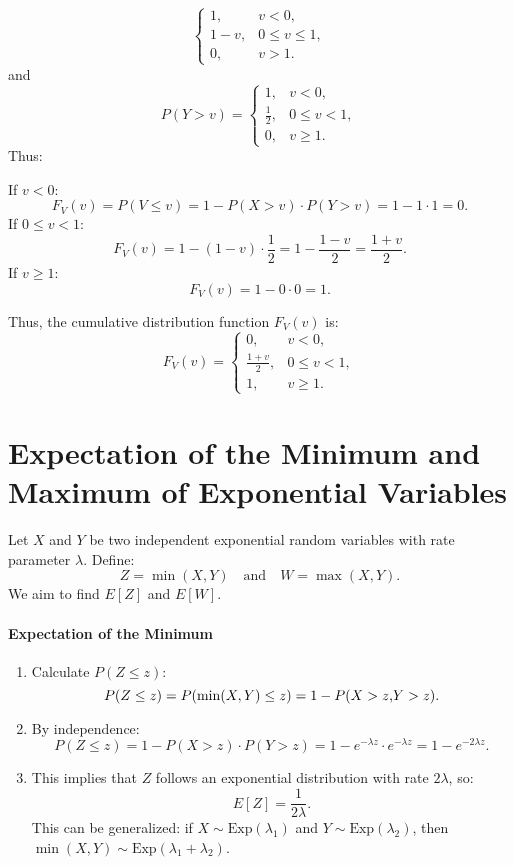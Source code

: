 \begin{enumerate}
\[\begin{cases}
1, & v < 0, \\
1 - v, & 0 \leq v \leq 1, \\
0, & v > 1.
\end{cases}
\]
and
\[
P(Y > v) = 
\begin{cases} 
1, & v < 0, \\
\frac{1}{2}, & 0 \leq v < 1, \\
0, & v \geq 1.
\end{cases}
\]
Thus:
\begin{enumerate}
{If \( v < 0 \):}
   \[
   F_V(v) = P(V \leq v) = 1 - P(X > v) \cdot P(Y > v) = 1 - 1 \cdot 1 = 0.
   \]
{If \( 0 \leq v < 1 \):}
   \[
   F_V(v) = 1 - (1 - v) \cdot \frac{1}{2} = 1 - \frac{1 - v}{2} = \frac{1 + v}{2}.
   \]
{If \( v \geq 1 \):}
   \[
   F_V(v) = 1 - 0 \cdot 0 = 1.
   \]
\end{enumerate}
Thus, the cumulative distribution function \( F_V(v) \) is:
\[
F_V(v) = 
\begin{cases} 
0, & v < 0, \\
\frac{1 + v}{2}, & 0 \leq v < 1, \\
1, & v \geq 1.
\end{cases}
\]
\end{enumerate}


\section{Expectation of the Minimum and Maximum of Exponential Variables}
Let \( X \) and \( Y \) be two independent exponential random variables with rate parameter \( \lambda \). Define:
\[
Z = \min(X, Y) \quad \text{and} \quad W = \max(X, Y).
\]
We aim to find \( E[Z] \) and \( E[W] \).

\paragraph{Expectation of the Minimum}
\begin{enumerate}
    \item Calculate \( P(Z \leq z) \):
   \[
   P(Z \leq z) = P(\min(X, Y) \leq z) = 1 - P(X > z \text, Y > z).
   \]
    \item By independence:
   \[
   P(Z \leq z) = 1 - P(X > z) \cdot P(Y > z) = 1 - e^{-\lambda z} \cdot e^{-\lambda z} = 1 - e^{-2\lambda z}.
   \]
    \item This implies that \( Z \) follows an exponential distribution with rate \( 2\lambda \), so:
   \[
   E[Z] = \frac{1}{2\lambda}.
   \]
This can be generalized: if \( X \sim \text{Exp}(\lambda_1) \) and \( Y \sim \text{Exp}(\lambda_2) \), then \( \min(X, Y) \sim \text{Exp}(\lambda_1 + \lambda_2) \).
\end{enumerate}

